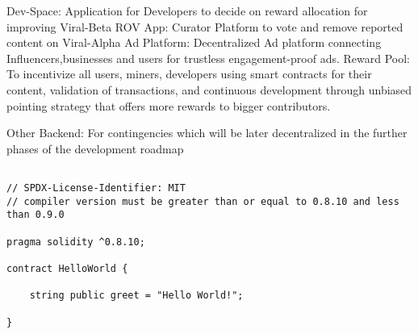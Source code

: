 \documentclass[10pt]{article}
\begin{document}
Dev-Space: Application for Developers to decide on reward allocation for improving Viral-Beta
ROV App: Curator Platform to vote and remove reported content on Viral-Alpha
Ad Platform: Decentralized Ad platform connecting Influencers,businesses and users for trustless engagement-proof ads.
Reward Pool: To incentivize all users, miners, developers using smart contracts for their content, validation of transactions, and continuous development through unbiased pointing strategy that offers more rewards to bigger contributors.

Other Backend: For contingencies which will be later decentralized in the further phases of the development roadmap







\begin{lstlisting}[language=Solidity, caption={Sample}]

// SPDX-License-Identifier: MIT
// compiler version must be greater than or equal to 0.8.10 and less than 0.9.0

pragma solidity ^0.8.10;

contract HelloWorld {

    string public greet = "Hello World!";
    
}

\end{lstlisting}

\end{document}
